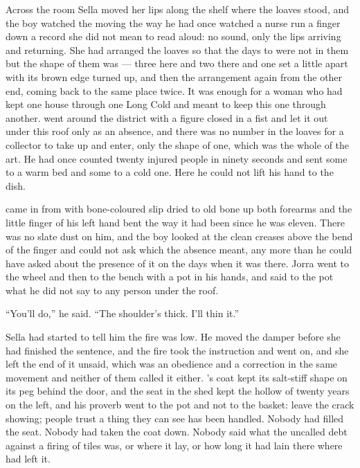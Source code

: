 Across the room Sella moved her lips along the shelf where the loaves stood, and the boy watched the moving the way he had once watched a nurse run a finger down a record she did not mean to read aloud: no sound, only the lips arriving and returning. She had arranged the loaves so that the days to  were not in them but the shape of them was --- three here and two there and one set a little apart with its brown edge turned up, and then the arrangement again from the other end, coming back to the same place twice. It was enough for a woman who had kept one house through one Long Cold and meant to keep this one through another.  went around the district with a figure closed in a fist and let it out under this roof only as an absence, and there was no number in the loaves for a collector to take up and enter, only the shape of one, which was the whole of the art. He had once counted twenty injured people in ninety seconds and sent some to a warm bed and some to a cold one. Here he could not lift his hand to the dish.

 came in from  with bone-coloured slip dried to old bone up both forearms and the little finger of his left hand bent the way it had been since he was eleven. There was no slate dust on him, and the boy looked at the clean creases above the bend of the finger and could not ask which the absence meant, any more than he could have asked about the presence of it on the days when it was there. Jorra went to the wheel and then to the bench with a pot in his hands, and said to the pot what he did not say to any person under the roof.

“You'll do,” he said. “The shoulder's thick. I'll thin it.”

Sella had started to tell him the fire was low. He moved the damper before she had finished the sentence, and the fire took the instruction and went on, and she left the end of it unsaid, which was an obedience and a correction in the same movement and neither of them called it either. 's coat kept its salt-stiff shape on its peg behind the door, and the seat in the shed kept the hollow of twenty years on the left, and his proverb went to the pot and not to the basket: leave the crack showing; people trust a thing they can see has been handled. Nobody had filled the seat. Nobody had taken the coat down. Nobody said what the uncalled debt against a firing of tiles was, or where it lay, or how long it had lain there where  had left it.

